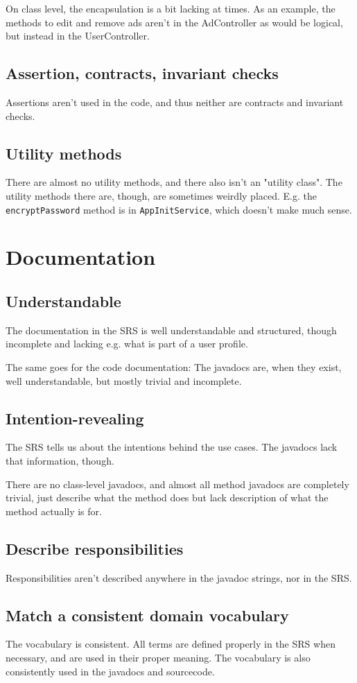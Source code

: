 \documentclass[a4wide]{article}
\begin{document}
On class level, the encapsulation is a bit lacking at times. As an example, the methods to edit and remove ads aren't in the AdController as would be logical, but instead in the UserController.
\subsection{Assertion, contracts, invariant checks}
Assertions aren't used in the code, and thus neither are contracts and invariant checks.

\subsection{Utility methods}
There are almost no utility methods, and there also isn't an "utility class". The utility methods there are, though, are sometimes weirdly placed. E.g. the \texttt{encryptPassword} method is in \texttt{AppInitService}, which doesn't make much sense.

\section{Documentation}
\subsection{Understandable}
The documentation in the SRS is well understandable and structured, though incomplete and lacking e.g. what is part of a user profile.

The same goes for the code documentation: The javadocs are, when they exist, well understandable, but mostly trivial and incomplete.
\subsection{Intention-revealing}
The SRS tells us about the intentions behind the use cases. The javadocs lack that information, though.

There are no class-level javadocs, and almost all method javadocs are completely trivial, just describe what the method
does but lack description of what the method actually is for.
\subsection{Describe responsibilities}
Responsibilities aren't described anywhere in the javadoc strings, nor in the SRS.
\subsection{Match a consistent domain vocabulary}
The vocabulary is consistent. All terms are defined properly in the SRS when necessary, and are used in their proper meaning. The vocabulary is also consistently used in the javadocs and sourcecode.
\end{document}
